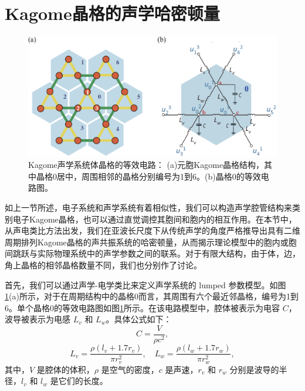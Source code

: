 \section{Kagome晶格的声学哈密顿量}

\begin{figure}[h!]
  \centering
  \includegraphics[width=1\textwidth]{images/fig3-2.eps} 
  \caption{Kagome声学系统体晶格的等效电路：
  (a)元胞Kagome晶格结构，其中晶格0居中，周围相邻的晶格分别编号为1到6。(b)晶格0的等效电路图。
  }
  \label{fig_3_2}
\end{figure}

如上一节所述，电子系统和声学系统有着相似性，我们可以构造声学腔管结构来类别电子Kagome晶格，也可以通过直觉调控其胞间和胞内的相互作用。在本节中，从声电类比方法出发，我们在亚波长尺度下从传统声学的角度严格推导出具有二维周期排列Kagome晶格的声共振系统的哈密顿量，从而揭示理论模型中的胞内或胞间跳跃与实际物理系统中的声学参数之间的联系。对于有限大结构，由于体，边，角上晶格的相邻晶格数量不同，我们也分别作了讨论。

首先，我们可以通过声学-电学类比来定义声学系统的 lumped 参数模型。如图\ref{fig_3_2}(a)所示，对于在周期结构中的晶格0而言，其周围有六个最近邻晶格，编号为1到6。单个晶格0的等效电路图如图\ref{fig_3_2}所示。在该电路模型中，腔体被表示为电容 \( C \)，波导被表示为电感 \( L_v \) 和 \( L_w \)。具体公式如下：
\begin{equation} \label{eq3-1}
  C = \frac{V}{\rho c^2},
\end{equation}
\begin{equation} \label{eq3-2}
  L_v = \frac{\rho (l_v + 1.7r_v)}{\pi r_v^2}, \quad L_w = \frac{\rho (l_w + 1.7r_w)}{\pi r_w^2},
\end{equation}
其中，\( V \) 是腔体的体积，\( \rho \) 是空气的密度，\( c \) 是声速，\( r_v \) 和 \( r_w \) 分别是波导的半径，\( l_v \) 和 \( l_w \) 是它们的长度。

